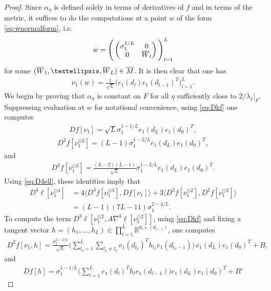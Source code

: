 \documentclass[10pt,a4paper]{amsart}
\newcommand{\RB}{\mathbb{R}}
\newcommand{\bM}{\overline{M}}
\newcommand{\bW}{\smash{\overline{W}}\vphantom{W}}
\begin{document}
\begin{proof}
    Since $\alpha_{\eta}$ is defined solely in terms of derivatives of $f$ and in terms of the metric, it suffices to do the computations at a point $w$ of the form \eqref{eq:wnormalform}, i.e.
    \begin{align}
    w  = \Bigg(\begin{pmatrix}\sigma_1^{1/L} & 0 \\ 0 & \bW_{l}\end{pmatrix}\Bigg)_{l=1}^L
    \end{align}
    for some $(\bW_1,\dots,\bW_L)\in \bM$. It is then clear that one has
    \begin{align}
    \nu_1(w) = \frac{1}{\sqrt{L}}\big(e_1(d_l)e_1(d_{l-1})^T\big)_{l=1}^L.
    \end{align}
    We begin by proving that $\alpha_{\eta}$ is constant on $F$ for all $\eta$ sufficiently close to $2/\lambda_1|_{F}$. Suppressing evaluation at $w$ for notational convenience, using \eqref{eq:Dkf} one computes
    \begin{align}
    Df[\nu_1] = \sqrt{L}\sigma_1^{1-1/L}e_1(d_L)e_1(d_0)^T,
    \end{align}
    \begin{align}
    D^2f[\nu_1^{\odot 2}] = (L-1)\sigma_1^{1-2/L}e_1(d_L)e_1(d_0)^T,
    \end{align}
    and
    \begin{align}
    D^3f[\nu_1^{\odot 3}] =\frac{(L-2)(L-1)}{\sqrt{L}}
\sigma_1^{1-3/L}e_1(d_L)e_1(d_0)^T.
    \end{align}
    Using \eqref{eq:D4ell}, these identities imply that
    \begin{align}
        D^4\ell[\nu_1^{\odot 4}] &= 4\langle D^3f[\nu_1^{\odot 3}],Df[\nu_1]\rangle + 3\langle D^2f[\nu_1^{\odot 2}],D^2f[\nu_1^{\odot 2}]\rangle\\&=(L-1)(7L-11)\sigma_1^{2-4/L}.
    \end{align}
    To compute the term $D^3\ell[\nu_1^{\odot 2},A\nabla^3\ell[\nu_1^{\odot 2}]]$, using \eqref{eq:Dkf} and fixing a tangent vector $h = (h_1,\dots,h_L)\in\prod_{l=1}^L\RB^{d_l\times (d_{l-1})}$, one computes
    \begin{align}
    D^2f[\nu_1,h] = \frac{\sigma_1^{1-2/L}}{\sqrt{L}}\bigg(\sum_{l_1=1}^L\sum_{l_2\neq l_1}e_1(d_{l_2})^Th_{l_2}e_1(d_{l_2-1})\bigg) \,e_1(d_L)e_1(d_0)^T + B,
    \end{align}
    and
    \begin{align}
    Df[h] = \sigma_1^{1-1/L}\bigg(\sum_{l=1}^Le_1(d_l)^Th_le_1(d_{l-1})\bigg)e_1(d_L)e_1(d_0)^T + B'

\end{align}
\end{proof}
\end{document}
